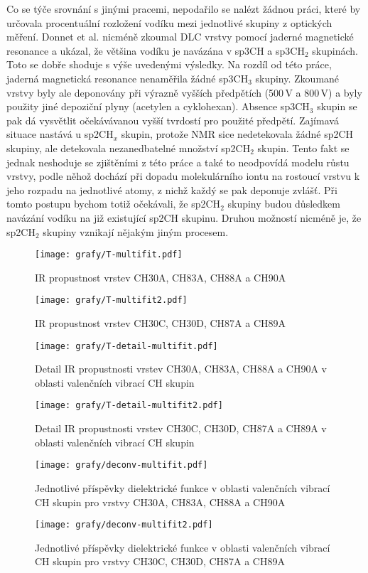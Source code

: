 Co se týče srovnání s jinými pracemi, nepodařilo se nalézt žádnou práci, které by určovala procentuální rozložení vodíku mezi jednotlivé skupiny z optických měření. Donnet et al. \cite{Donnet1999} nicméně zkoumal DLC vrstvy pomocí jaderné magnetické resonance a ukázal, že většina vodíku je navázána v sp3CH a sp3CH$_2$ skupinách. 
Toto se dobře shoduje s výše uvedenými výsledky. Na rozdíl od této práce, jaderná magnetická resonance nenaměřila žádné sp3CH$_3$ skupiny. Zkoumané vrstvy byly ale deponovány při výrazně vyšších předpětích (500\,V a 800\,V) a byly použity jiné depoziční plyny (acetylen a cyklohexan). Absence sp3CH$_3$ skupin se pak dá vysvětlit očekávávanou vyšší tvrdostí pro použité předpětí. Zajímavá situace nastává u sp2CH$_x$ skupin, protože NMR sice nedetekovala žádné sp2CH skupiny, ale detekovala nezanedbatelné množství sp2CH$_2$ skupin. 
Tento fakt se jednak neshoduje se zjištěními z této práce a také to neodpovídá modelu růstu vrstvy, podle něhož dochází při dopadu molekulárního iontu na rostoucí vrstvu k jeho rozpadu na jednotlivé atomy, z nichž každý se pak deponuje zvlášť. Při tomto postupu bychom totiž očekávali, že sp2CH$_2$ skupiny budou důsledkem navázání vodíku na již existující sp2CH skupinu. Druhou možností nicméně je, že sp2CH$_2$ skupiny vznikají nějakým jiným procesem.

\begin{figure}[ht]
	\texttt{[image: grafy/T-multifit.pdf]}
	\caption{IR propustnost vrstev CH30A, CH83A, CH88A a CH90A}
	\label{T-multifit}
\end{figure}

\begin{figure}[ht]
	\texttt{[image: grafy/T-multifit2.pdf]}
	\caption{IR propustnost vrstev CH30C, CH30D, CH87A a CH89A}
	\label{T-multifit2}
\end{figure}

\begin{figure}[ht]
	\texttt{[image: grafy/T-detail-multifit.pdf]}
	\caption{Detail IR propustnosti vrstev CH30A, CH83A, CH88A a CH90A v oblasti valenčních vibrací CH skupin}
	\label{T-detail}
\end{figure}

\begin{figure}[ht]
	\texttt{[image: grafy/T-detail-multifit2.pdf]}
	\caption{Detail IR propustnosti vrstev CH30C, CH30D, CH87A a CH89A v oblasti valenčních vibrací CH skupin}
	\label{T-detail2}
\end{figure}

\begin{figure}[ht]
	\texttt{[image: grafy/deconv-multifit.pdf]}
	\caption{Jednotlivé příspěvky dielektrické funkce v oblasti valenčních vibrací CH skupin pro vrstvy CH30A, CH83A, CH88A a CH90A}
	\label{deconvolute}
\end{figure}

\begin{figure}[ht]
	\texttt{[image: grafy/deconv-multifit2.pdf]}
	\caption{Jednotlivé příspěvky dielektrické funkce v oblasti valenčních vibrací CH skupin pro vrstvy CH30C, CH30D, CH87A a CH89A}
	\label{deconvolute2}
\end{figure}

\cleardoublepage

